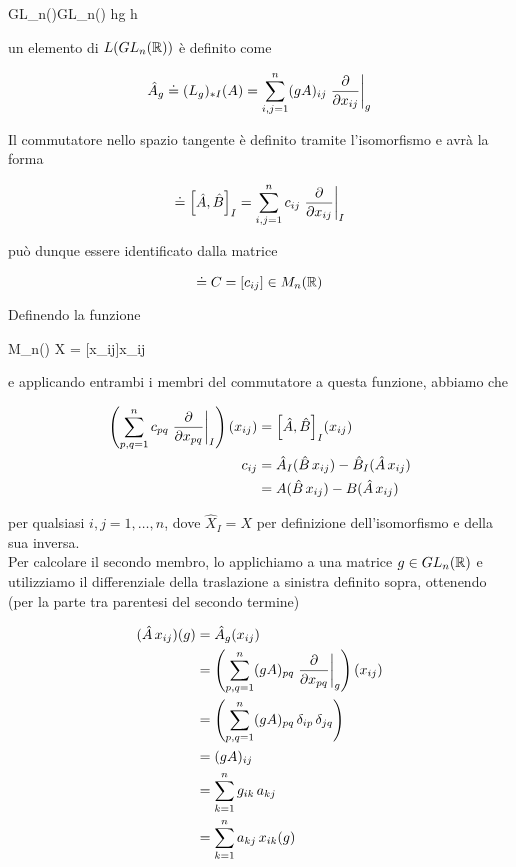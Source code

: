 	{GL_{n}(\R)}{GL_{n}(\R)}
	{h}{g h}

un elemento di $ L(GL_{n}(\mathbb{R})) $ è definito come

\begin{equation}
	\hat{A}_{g} \doteq (L_{g})_{*I} (A) %
	= \sum_{i,j=1}^{n} (g A)_{ij} \eval{ \pdv{x_{ij}} }_{g}
\end{equation}

Il commutatore nello spazio tangente è definito tramite l'isomorfismo e avrà la forma

\begin{equation}
	[A,B] \doteq \comm{\hat{A}}{\hat{B}}_{I} = \sum_{i,j=1}^{n} c_{ij} \eval{ \pdv{x_{ij}} }_{I}
\end{equation}

può dunque essere identificato dalla matrice

\begin{equation}
	[A,B] \doteq C = [c_{ij}] \in M_{n}(\R)
\end{equation}

Definendo la funzione

	{M_{n}(\R)}{\R}
	{X = [x_{ij}]}{x_{ij}}

e applicando entrambi i membri del commutatore a questa funzione, abbiamo che

\begin{align}
	\begin{split}
		\left( \sum_{p,q=1}^{n} c_{pq} \eval{ \pdv{x_{pq}} }_{I} \right)(x_{ij}) &= \comm{\hat{A}}{\hat{B}}_{I} (x_{ij}) \\
		c_{ij} &= \hat{A}_{I} (\hat{B} \, x_{ij}) - \hat{B}_{I} (\hat{A} \, x_{ij}) \\
		&= A (\hat{B} \, x_{ij}) - B (\hat{A} \, x_{ij})
	\end{split}
\end{align}

per qualsiasi $ i,j = 1,\dots,n $, dove $ \hat{X}_{I} = X $ per definizione dell'isomorfismo e della sua inversa.\\
Per calcolare il secondo membro, lo applichiamo a una matrice $ g \in GL_{n}(\mathbb{R}) $ e utilizziamo il differenziale della traslazione a sinistra definito sopra, ottenendo (per la parte tra parentesi del secondo termine)

\begin{align}
	\begin{split}
		(\hat{A} \, x_{ij})(g) &= \hat{A}_{g} (x_{ij}) \\
		&= \left( \sum_{p,q=1}^{n} (g A)_{pq} \eval{ \pdv{x_{pq}} }_{g} \right)(x_{ij}) \\
		&= \left( \sum_{p,q=1}^{n} (g A)_{pq} \, \delta_{ip} \, \delta_{jq} \right) \\
		&= (g A)_{ij} \\
		&= \sum_{k=1}^{n} g_{ik} \, a_{kj} \\
		&= \sum_{k=1}^{n} a_{kj} \, x_{ik}(g)
	\end{split}
\end{align}

